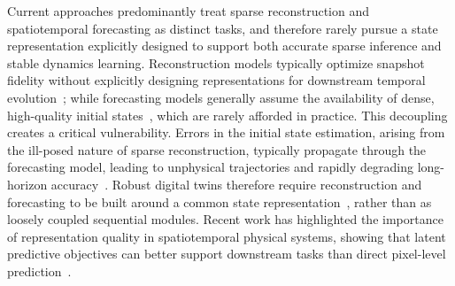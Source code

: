 \documentclass[pdflatex,sn-nature]{sn-jnl}%
\begin{document}
Current approaches predominantly treat sparse reconstruction and spatiotemporal forecasting as distinct tasks, and therefore rarely pursue a state representation explicitly designed to support both accurate sparse inference and stable dynamics learning.
Reconstruction models typically optimize snapshot fidelity without explicitly designing representations for downstream temporal evolution~\cite{fukami2021global, santos2023development, liu2025enhancing, WANG2025}; while forecasting models generally assume the availability of dense, high-quality initial states~\cite{SoleraRico2024, kontolati2024learning, tomasetto2025reduced}, which are rarely afforded in practice.
This decoupling creates a critical vulnerability. 
Errors in the initial state estimation, arising from the ill-posed nature of sparse reconstruction, typically propagate through the forecasting model, leading to unphysical trajectories and rapidly degrading long-horizon accuracy~\cite{brajard2020combining, chattopadhyay2020data, cheng2024efficient}.
Robust digital twins therefore require reconstruction and forecasting to be built around a common state representation~\cite{Huang2024representation}, rather than as loosely coupled sequential modules.
Recent work has highlighted the importance of representation quality in spatiotemporal physical systems, showing that latent predictive objectives can better support downstream tasks than direct pixel-level prediction~\cite{qu2026representation}.
\end{document}
